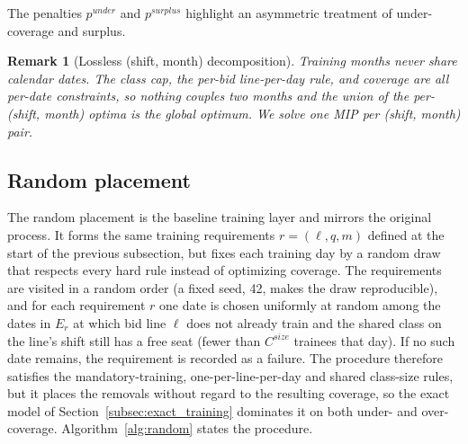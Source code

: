 \documentclass[preprint,12pt]{elsarticle}
\newtheorem{remark}{Remark}
\begin{document}
   The penalties $p^{under}$ and $p^{surplus}$ highlight an asymmetric treatment of under-coverage and surplus. 

   \begin{remark}[Lossless (shift, month) decomposition] 
      Training months never share calendar dates. The class cap, the per-bid line-per-day rule, and coverage are all per-date constraints, so nothing couples two months and the union of the per-(shift, month) optima is the global optimum. We solve one MIP per (shift, month) pair.
   \end{remark}

   \subsection{Random placement}\label{subsec:random_placement}
   The random placement is the baseline training layer and mirrors the original process. It forms the same training requirements $r=(\ell,q,m)$ defined at the start of the previous subsection, but fixes each training day by a random draw that respects every hard rule instead of optimizing coverage. The requirements are visited in a random order (a fixed seed, 42, makes the draw reproducible), and for each requirement $r$ one date is chosen uniformly at random among the dates in $E_r$ at which bid line $\ell$ does not already train and the shared class on the line's shift still has a free seat (fewer than $C^{size}$ trainees that day). If no such date remains, the requirement is recorded as a failure. The procedure therefore satisfies the mandatory-training, one-per-line-per-day and shared class-size rules, but it places the removals without regard to the resulting coverage, so the exact model of Section~\ref{subsec:exact_training} dominates it on both under- and over-coverage. Algorithm~\ref{alg:random} states the procedure.
\end{document}
